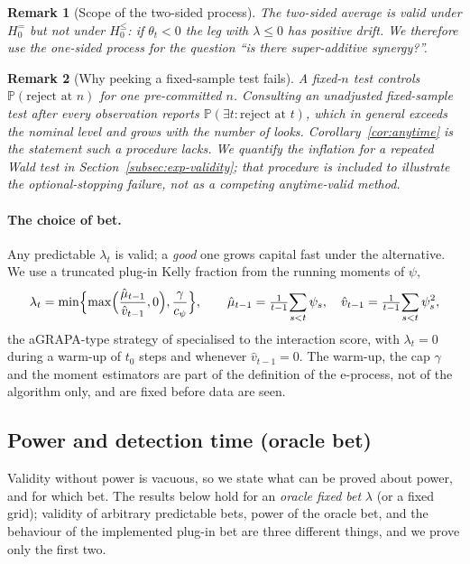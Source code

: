 \documentclass[pdflatex,sn-mathphys-ay]{sn-jnl}%
\theoremstyle{thmstyleone}%
\theoremstyle{thmstyletwo}%
\newtheorem{remark}{Remark}%
\theoremstyle{thmstylethree}%
\newcommand{\Prob}{\mathbb{P}}
\begin{document}
\begin{remark}[Scope of the two-sided process]\label{rem:twosided}
The two-sided average is valid under $H_0^{=}$ but \emph{not} under $H_0^{\le}$: if
$\theta_t<0$ the leg with $\lambda\le0$ has positive drift. We therefore use the one-sided
process for the question ``is there super-additive synergy?''.
\end{remark}

\begin{remark}[Why peeking a fixed-sample test fails]\label{rem:peeking}
A fixed-$n$ test controls $\Prob(\text{reject at } n)$ for one pre-committed $n$. Consulting
an unadjusted fixed-sample test after every observation reports
$\Prob(\exists t:\text{reject at }t)$, which in general exceeds the nominal level and
grows with the number of looks. Corollary~\ref{cor:anytime} is the statement such a
procedure lacks. We quantify the inflation for a repeated Wald test in
Section~\ref{subsec:exp-validity}; that procedure is included to illustrate the
optional-stopping failure, not as a competing anytime-valid method.
\end{remark}

\paragraph{The choice of bet.} Any predictable $\lambda_t$ is valid; a \emph{good} one grows
capital fast under the alternative. We use a truncated plug-in Kelly fraction from the
running moments of $\psi$,
\begin{equation}\label{eq:grapa}
\lambda_t=\min\Bigl\{\max\Bigl(\frac{\hat\mu_{t-1}}{\hat v_{t-1}},0\Bigr),\frac{\gamma}{c_\psi}\Bigr\},
\qquad
\hat\mu_{t-1}=\tfrac{1}{t-1}\!\sum_{s<t}\psi_s,\quad
\hat v_{t-1}=\tfrac{1}{t-1}\!\sum_{s<t}\psi_s^2,
\end{equation}
the aGRAPA-type strategy of \citet{waudbysmith2024} specialised to the interaction score,
with $\lambda_t=0$ during a warm-up of $t_0$ steps and whenever $\hat v_{t-1}=0$. The warm-up, the cap $\gamma$ and the
moment estimators are part of the definition of the e-process, not of the algorithm only,
and are fixed before data are seen.

\subsection{Power and detection time (oracle bet)}\label{subsec:power}

Validity without power is vacuous, so we state what can be proved about power, and for
which bet. The results below hold for an \emph{oracle fixed bet} $\lambda$ (or a fixed
grid); validity of arbitrary predictable bets, power of the oracle bet, and the behaviour
of the implemented plug-in bet are three different things, and we prove only the first two.
\end{document}
